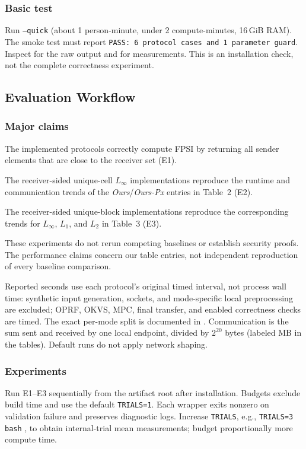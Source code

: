 \subsubsection{Basic test}
Run  \texttt{--quick}
(about 1 person-minute, under 2 compute-minutes, 16\,GiB RAM).
The smoke test must report
\texttt{PASS: 6 protocol cases and 1 parameter guard}.
Inspect  for the raw output and
 for measurements. This is an installation check,
not the complete correctness experiment.

\subsection{Evaluation Workflow}
\subsubsection{Major claims}
\begin{compactitem}
\item[(C1)] The implemented protocols correctly compute FPSI by returning all
sender elements that are close to the receiver set (E1).
\item[(C2)] The receiver-sided unique-cell $L_\infty$ implementations
reproduce the runtime and communication trends of the
\emph{Ours}/\emph{Ours-Px} entries in Table~2 (E2).
\item[(C3)] The receiver-sided unique-block implementations reproduce
the corresponding trends for $L_\infty$, $L_1$, and $L_2$ in Table~3 (E3).
\end{compactitem}
These experiments do not rerun competing baselines or establish security
proofs. The performance claims concern our table entries, not independent
reproduction of every baseline comparison.

Reported seconds use each protocol's original timed interval, not process
wall time: synthetic input generation, sockets, and mode-specific local
preprocessing are excluded; OPRF, OKVS, MPC, final transfer, and enabled
correctness checks are timed. The exact per-mode split is documented in
. Communication is the sum sent and received
by one local endpoint, divided by $2^{20}$ bytes (labeled MB in the tables).
Default runs do not apply network shaping.

\subsubsection{Experiments}
Run E1--E3 sequentially from the artifact root after installation. Budgets
exclude build time and use the default \texttt{TRIALS=1}. Each wrapper exits
nonzero on validation failure and preserves diagnostic logs. Increase
\texttt{TRIALS}, e.g., \texttt{TRIALS=3} \texttt{bash} , to obtain
internal-trial mean measurements; budget proportionally more compute time.

